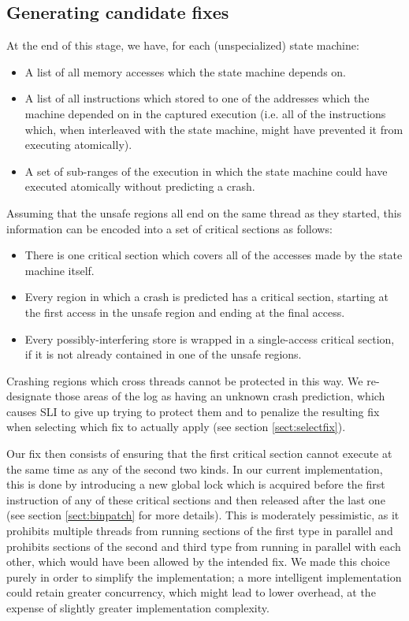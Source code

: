 \documentclass[10pt,twocolumn,preprint,natbib,authoryear]{sigplanconf}
\begin{document}
\subsection{Generating candidate fixes}
\label{sect:gen_fix}

At the end of this stage, we have, for each (unspecialized) state machine:

\begin{itemize}
\item A list of all memory accesses which the state machine depends
  on.
\item A list of all instructions which stored to one of the addresses
  which the machine depended on in the captured execution (i.e. all of
  the instructions which, when interleaved with the state machine,
  might have prevented it from executing atomically).
\item A set of sub-ranges of the execution in which the state machine
  could have executed atomically without predicting a crash.
\end{itemize}

Assuming that the unsafe regions all end on the same thread as they
started, this information can be encoded into a set of critical
sections as follows:

\begin{itemize}
\item There is one critical section which covers all of the accesses
  made by the state machine itself.
\item Every region in which a crash is predicted has a critical
  section, starting at the first access in the unsafe region and
  ending at the final access.
\item Every possibly-interfering store is wrapped in a single-access
  critical section, if it is not already contained in one of the
  unsafe regions.
\end{itemize}

Crashing regions which cross threads cannot be protected in this way.
We re-designate those areas of the log as having an unknown crash
prediction, which causes SLI to give up trying to protect them and to
penalize the resulting fix when selecting which fix to actually apply
(see section \ref{sect:selectfix}).

Our fix then consists of ensuring that the first critical section
cannot execute at the same time as any of the second two kinds.  In
our current implementation, this is done by introducing a new global
lock which is acquired before the first instruction of any of these
critical sections and then released after the last one (see section
\ref{sect:binpatch} for more details).  This is moderately
pessimistic, as it prohibits multiple threads from running sections of
the first type in parallel and prohibits sections of the second and
third type from running in parallel with each other, which would have
been allowed by the intended fix.  We made this choice purely in order
to simplify the implementation; a more intelligent implementation
could retain greater concurrency, which might lead to lower overhead,
at the expense of slightly greater implementation complexity.
\end{document}
